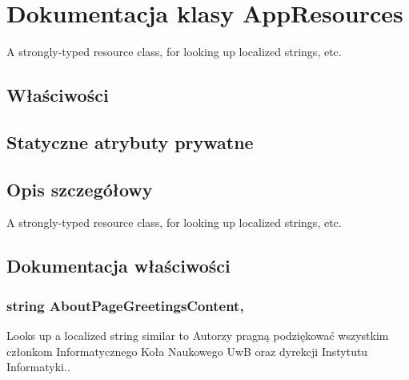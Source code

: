 \hypertarget{a00006}{}\section{Dokumentacja klasy App\+Resources}
\label{a00006}


A strongly-\/typed resource class, for looking up localized strings, etc.  


\subsection*{Właściwości}
\subsection*{Statyczne atrybuty prywatne}


\subsection{Opis szczegółowy}
A strongly-\/typed resource class, for looking up localized strings, etc. 



\subsection{Dokumentacja właściwości}
\hypertarget{a00006_a35cba558ac6335ebbf80076ba2d0cc46}{}
\subsubsection[{About\+Page\+Greetings\+Content}]{\setlength{\rightskip}{0pt plus 5cm}string About\+Page\+Greetings\+Content\hspace{0.3cm}{\ttfamily [static]}, {\ttfamily [get]}}\label{a00006_a35cba558ac6335ebbf80076ba2d0cc46}


Looks up a localized string similar to Autorzy pragną podziękować wszystkim członkom Informatycznego Koła Naukowego Uw\+B oraz dyrekcji Instytutu Informatyki.. 

\hypertarget{a00006_ad442824443a193843c08bb63927b9f65}{}

